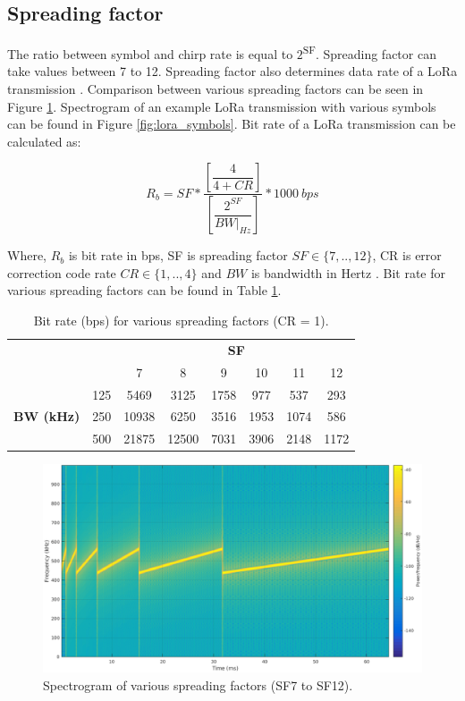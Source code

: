 \subsection{Spreading factor}

The ratio between symbol and chirp rate is equal to $2$\textsuperscript{SF}. Spreading factor can take values between 7 to 12. Spreading factor also determines data rate of a LoRa transmission \cite{AN1200.22}. Comparison between various spreading factors can be seen in Figure \ref{fig:lora_sf_comparasion}. Spectrogram of an example LoRa transmission with various symbols can be found in Figure \ref{fig:lora_symbols}. Bit rate of a LoRa transmission can be calculated as:

\begin{equation} \label{eq:bit_rate_sf}
R_{b} = SF * \dfrac{\left[ \dfrac{4}{4+CR} \right] }{ \left[ \dfrac{2^{SF}}{BW|_{Hz}} \right]} * 1000 \ bps
\end{equation}

Where, $R_{b}$ is bit rate in bps, SF is spreading factor $SF \in \{7,..,12\}$, CR is error correction code rate $CR \in \{1,..,4\}$ and $BW$ is bandwidth in Hertz \cite{AN1200.22}. Bit rate for various spreading factors can be found in Table \ref{table:sf_data_rate}.

\begin{table}
\centering
\caption{Bit rate (bps) for various spreading factors (CR = 1).}
\label{table:sf_data_rate}
\begin{tabular}{|c|c|c|c|c|c|c|c|}
\hline
\multicolumn{2}{|c|}{\multirow{2}{*}{}} & \multicolumn{6}{c|}{\textbf{SF}} \\ \cline{3-8}
\multicolumn{2}{|c|}{}                  &    7 &    8 &    9 &   10 &   11 &   12 \\ \hline
\multirow{3}{*}{\textbf{BW (kHz)}}  & 125 & 5469 & 3125 & 1758 & 977 & 537 & 293 \\ \cline{2-8}
                                    & 250 & 10938 & 6250 & 3516 & 1953 & 1074 & 586 \\ \cline{2-8}
                                    & 500 & 21875 & 12500 & 7031 & 3906 & 2148 & 1172 \\ \hline
\end{tabular}
\end{table}

\begin{figure}
\centering
\includegraphics[width=.7\linewidth]{fig/lora_sf_comparasion.png}
\vspace*{4mm}
\caption{Spectrogram of various spreading factors (SF7 to SF12). \cite{sghoslya_lora}}
\label{fig:lora_sf_comparasion}
\end{figure}

